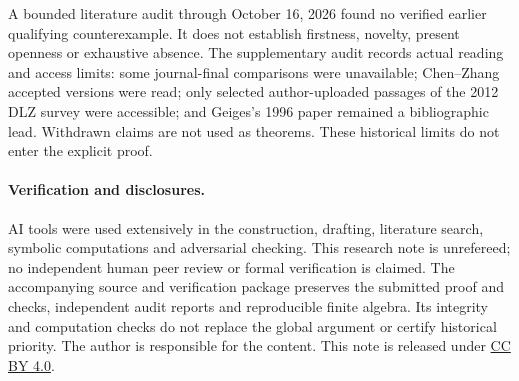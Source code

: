 \documentclass[11pt]{article}
\begin{document}
A bounded literature audit through October 16, 2026 found no verified earlier
qualifying counterexample. It does not establish firstness, novelty, present
openness or exhaustive absence. The supplementary audit records actual
reading and access limits: some journal-final comparisons were unavailable;
Chen--Zhang accepted versions were read; only selected author-uploaded
passages of the 2012 DLZ survey were accessible; and Geiges's 1996 paper
remained a bibliographic lead. Withdrawn claims \cite{LU,TWold} are not
used as theorems. These historical limits do not enter the explicit proof.

\paragraph{Verification and disclosures.}
AI tools were used extensively in the construction, drafting, literature
search, symbolic computations and adversarial checking. This research note
is unrefereed; no independent human peer review or formal verification is
claimed. The accompanying source and verification package preserves the
submitted proof and checks, independent audit reports and reproducible finite
algebra. Its integrity and computation checks do not replace the global
argument or certify historical priority. The author is responsible for the
content. This note is released under
\href{https://creativecommons.org/licenses/by/4.0/}{CC BY 4.0}.
\end{document}
